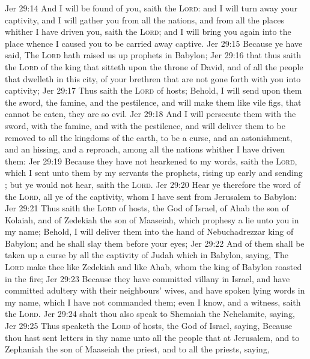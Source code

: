 \vs Jer 29:14 And I will be found of you, saith the \textsc{Lord}: and I will turn away your captivity, and I will gather you from all the nations, and from all the places whither I have driven you, saith the \textsc{Lord}; and I will bring you again into the place whence I caused you to be carried away captive.
\vs Jer 29:15 Because ye have said, The \textsc{Lord} hath raised us up prophets in Babylon;
\vs Jer 29:16  that thus saith the \textsc{Lord} of the king that sitteth upon the throne of David, and of all the people that dwelleth in this city,  of your brethren that are not gone forth with you into captivity;
\vs Jer 29:17 Thus saith the \textsc{Lord} of hosts; Behold, I will send upon them the sword, the famine, and the pestilence, and will make them like vile figs, that cannot be eaten, they are so evil.
\vs Jer 29:18 And I will persecute them with the sword, with the famine, and with the pestilence, and will deliver them to be removed to all the kingdoms of the earth, to be a curse, and an astonishment, and an hissing, and a reproach, among all the nations whither I have driven them:
\vs Jer 29:19 Because they have not hearkened to my words, saith the \textsc{Lord}, which I sent unto them by my servants the prophets, rising up early and sending ; but ye would not hear, saith the \textsc{Lord}.
\vs Jer 29:20 Hear ye therefore the word of the \textsc{Lord}, all ye of the captivity, whom I have sent from Jerusalem to Babylon:
\vs Jer 29:21 Thus saith the \textsc{Lord} of hosts, the God of Israel, of Ahab the son of Kolaiah, and of Zedekiah the son of Maaseiah, which prophesy a lie unto you in my name; Behold, I will deliver them into the hand of Nebuchadrezzar king of Babylon; and he shall slay them before your eyes;
\vs Jer 29:22 And of them shall be taken up a curse by all the captivity of Judah which  in Babylon, saying, The \textsc{Lord} make thee like Zedekiah and like Ahab, whom the king of Babylon roasted in the fire;
\vs Jer 29:23 Because they have committed villany in Israel, and have committed adultery with their neighbours' wives, and have spoken lying words in my name, which I have not commanded them; even I know, and  a witness, saith the \textsc{Lord}.
\vs Jer 29:24  shalt thou also speak to Shemaiah the Nehelamite, saying,
\vs Jer 29:25 Thus speaketh the \textsc{Lord} of hosts, the God of Israel, saying, Because thou hast sent letters in thy name unto all the people that  at Jerusalem, and to Zephaniah the son of Maaseiah the priest, and to all the priests, saying,
